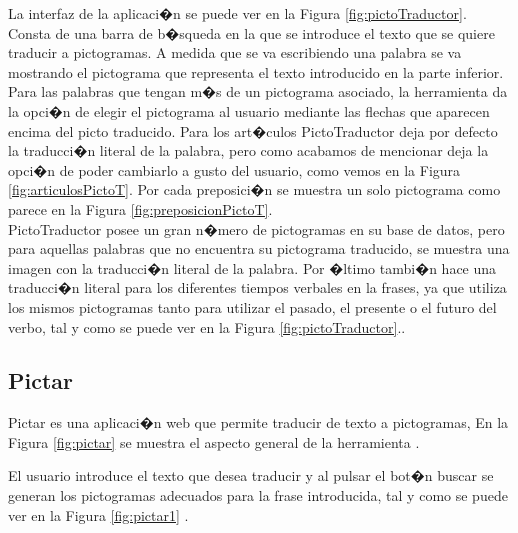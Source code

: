 La interfaz de la aplicaci�n se puede ver en la Figura \ref{fig:pictoTraductor}. Consta de una barra de b�squeda en la que se introduce el texto que se quiere traducir a pictogramas. A medida que se va escribiendo una palabra se va mostrando el pictograma que representa el texto introducido en la parte inferior. Para las palabras que tengan m�s de un pictograma asociado, la herramienta da la opci�n de elegir el pictograma al usuario mediante las flechas que aparecen encima del picto traducido.
Para los art�culos PictoTraductor deja por defecto la traducci�n literal de la palabra, pero como acabamos de mencionar deja la opci�n de poder cambiarlo a gusto del usuario, como vemos en la Figura \ref{fig:articulosPictoT}.
Por cada preposici�n se muestra un solo pictograma como parece en la Figura \ref{fig:preposicionPictoT}.
\\
PictoTraductor posee un gran n�mero de pictogramas en su base de datos, pero para aquellas palabras que no encuentra su pictograma traducido, se muestra una imagen con la traducci�n literal de la palabra. Por �ltimo tambi�n hace una traducci�n literal para los diferentes tiempos verbales en la frases, ya que utiliza los mismos pictogramas tanto para utilizar el pasado, el presente o el futuro del verbo, tal y como se puede ver en la Figura \ref{fig:pictoTraductor}..


\subsection{Pictar}
Pictar \citep{MartinGuerrero2018} es una aplicaci�n web que permite traducir de texto a pictogramas, En la Figura \ref{fig:pictar} se muestra el aspecto general de la herramienta     .

El usuario introduce el texto que desea traducir y al pulsar el bot�n buscar 
se generan los pictogramas adecuados para la frase introducida, tal y como se puede ver en la Figura \ref{fig:pictar1} .

